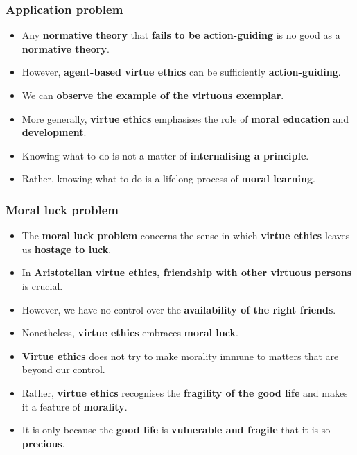 \documentclass[11pt]{article}
\begin{document}
\subsubsection{Application problem}
\label{sec:org31f3307}
\begin{itemize}
\item Any \textbf{normative theory} that \textbf{fails to be action-guiding} is no good as a \textbf{normative theory}.
\item However, \textbf{agent-based virtue ethics} can be sufficiently \textbf{action-guiding}.
\item We can \textbf{observe the example of the virtuous exemplar}.
\item More generally, \textbf{virtue ethics} emphasises the role of \textbf{moral education} and \textbf{development}.
\item Knowing what to do is not a matter of \textbf{internalising a principle}.
\item Rather, knowing what to do is a lifelong process of \textbf{moral learning}.
\end{itemize}
\subsubsection{Moral luck problem}
\label{sec:org9b69eb5}
\begin{itemize}
\item The \textbf{moral luck problem} concerns the sense in which \textbf{virtue ethics} leaves us \textbf{hostage to luck}.
\item In \textbf{Aristotelian virtue ethics, friendship with other virtuous persons} is crucial.
\item However, we have no control over the \textbf{availability of the right friends}.
\item Nonetheless, \textbf{virtue ethics} embraces \textbf{moral luck}.
\item \textbf{Virtue ethics} does not try to make morality immune to matters that are beyond our control.
\item Rather, \textbf{virtue ethics} recognises the \textbf{fragility of the good life} and makes it a feature of \textbf{morality}.
\item It is only because the \textbf{good life} is \textbf{vulnerable and fragile} that it is so \textbf{precious}.
\end{itemize}

 \newpage
\end{document}
